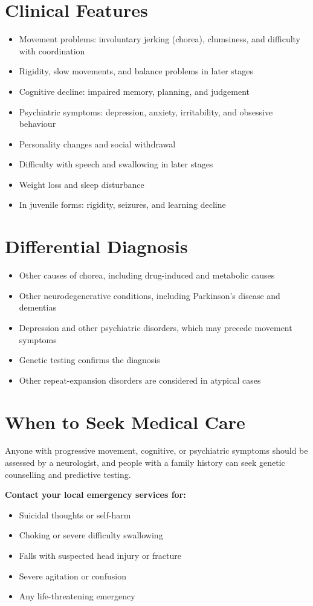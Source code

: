 \section*{Clinical Features}
\begin{itemize}
    \item Movement problems: involuntary jerking (chorea), clumsiness, and difficulty with coordination
    \item Rigidity, slow movements, and balance problems in later stages
    \item Cognitive decline: impaired memory, planning, and judgement
    \item Psychiatric symptoms: depression, anxiety, irritability, and obsessive behaviour
    \item Personality changes and social withdrawal
    \item Difficulty with speech and swallowing in later stages
    \item Weight loss and sleep disturbance
    \item In juvenile forms: rigidity, seizures, and learning decline
\end{itemize}

\section*{Differential Diagnosis}
\begin{itemize}
    \item Other causes of chorea, including drug-induced and metabolic causes
    \item Other neurodegenerative conditions, including Parkinson's disease and dementias
    \item Depression and other psychiatric disorders, which may precede movement symptoms
    \item Genetic testing confirms the diagnosis
    \item Other repeat-expansion disorders are considered in atypical cases
\end{itemize}

\section*{When to Seek Medical Care}
Anyone with progressive movement, cognitive, or psychiatric symptoms should be assessed by a neurologist, and people with a family history can seek genetic counselling and predictive testing.

\textbf{Contact your local emergency services for:}
\begin{itemize}
    \item Suicidal thoughts or self-harm
    \item Choking or severe difficulty swallowing
    \item Falls with suspected head injury or fracture
    \item Severe agitation or confusion
    \item Any life-threatening emergency
\end{itemize}


